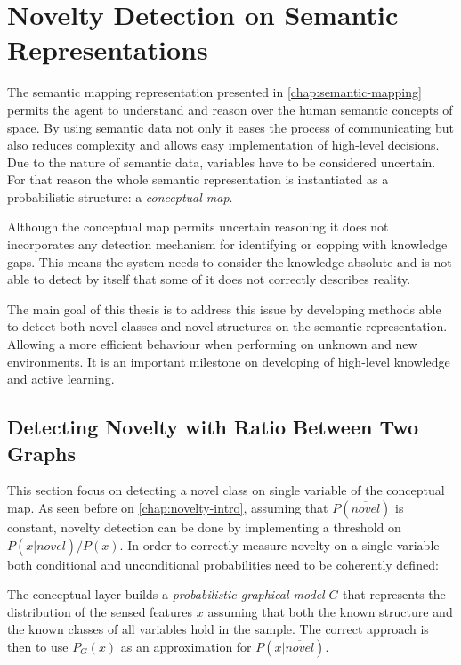 \chapter{Novelty Detection on Semantic Representations}\label{chap:novelty}
The semantic mapping representation presented in \autoref{chap:semantic-mapping}
permits the agent to understand and reason over the human semantic concepts of
space. By using semantic data not only it eases the process of communicating 
but also reduces complexity and allows easy implementation of high-level
decisions.
Due to the nature of semantic data, variables have to be considered
uncertain. For that reason the whole semantic representation is instantiated
as a probabilistic structure: a \emph{conceptual map}. 

Although the conceptual map permits uncertain reasoning it does not incorporates
any detection mechanism for identifying or copping with knowledge gaps.
This means the system needs to consider the knowledge absolute and is not
able to detect by itself that some of it does not correctly describes reality. 

The main goal of this thesis is to address this issue by developing methods
able to detect both novel classes and novel structures on the semantic
representation. Allowing a more efficient behaviour when performing on unknown
and new environments. It is an important milestone on developing of high-level
knowledge and active learning.


\section{Detecting Novelty with Ratio Between Two Graphs}
This section focus on detecting a novel class on single variable of the
conceptual map. As seen before on \autoref{chap:novelty-intro},
assuming that $P(\overline{novel})$ is constant, novelty detection can be
done by implementing a threshold on $P(x|\overline{novel})/P(x)$.
In order to correctly measure novelty on a single variable both
conditional and unconditional probabilities need to be coherently defined:

The conceptual layer builds a \emph{probabilistic graphical model} $G$ that
represents the distribution of the sensed features $x$ assuming that both the
known structure and the known classes of all variables hold in the sample.
The correct approach is then to use $P_G(x)$ as an approximation for
$P(x|\overline{novel})$.

